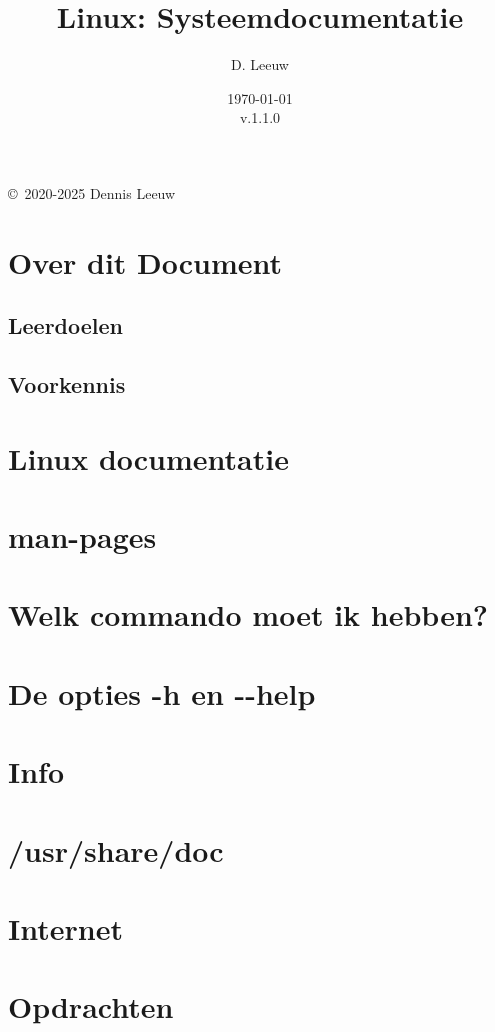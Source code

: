 \documentclass[a4paper,12pt,twoside,openright,titlepage]{article}
\author{D. Leeuw}
\title{Linux: Systeemdocumentatie}
\date{\today\\v.1.1.0}
\begin{document}

\maketitle

\copyright\ 2020-2025 Dennis Leeuw\\




\section{Over dit Document}
\subsection{Leerdoelen}

\subsection{Voorkennis}



\section{Linux documentatie}

\section{man-pages}

\section{Welk commando moet ik hebben?}

\section{De opties -h en -{}-help}

\section{Info}

\section{/usr/share/doc}

\section{Internet}

\section{Opdrachten}


\printindex
\end{document}
